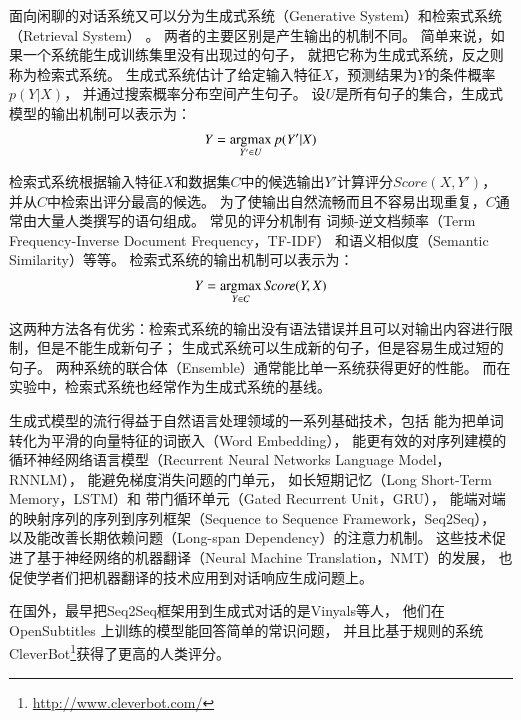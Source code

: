 面向闲聊的对话系统又可以分为生成式系统（Generative System）和检索式系统（Retrieval System）
。
两者的主要区别是产生输出的机制不同。
简单来说，如果一个系统能生成训练集里没有出现过的句子，
就把它称为生成式系统，反之则称为检索式系统。
生成式系统估计了给定输入特征$X$，预测结果为$Y$的条件概率$p(Y|X)$，
并通过搜索概率分布空间产生句子。
设$U$是所有句子的集合，生成式模型的输出机制可以表示为：
\begin{align}
    Y = \operatorname*{argmax}_{Y'\in U} p(Y'|X)
\end{align}

检索式系统根据输入特征$X$和数据集$C$中的候选输出$Y'$计算评分$\textit{Score}(X, Y')$，
并从$C$中检索出评分最高的候选。
为了使输出自然流畅而且不容易出现重复，$C$通常由大量人类撰写的语句组成。
常见的评分机制有
词频-逆文档频率（Term Frequency-Inverse Document Frequency，TF-IDF）
和语义相似度（Semantic Similarity）等等。
检索式系统的输出机制可以表示为：
\begin{align}
    Y = \operatorname*{argmax}_{Y\in C} \textit{Score}(Y, X)
\end{align}

这两种方法各有优劣：检索式系统的输出没有语法错误并且可以对输出内容进行限制，但是不能生成新句子；
生成式系统可以生成新的句子，但是容易生成过短的句子。
两种系统的联合体（Ensemble）通常能比单一系统获得更好的性能。
而在实验中，检索式系统也经常作为生成式系统的基线。

生成式模型的流行得益于自然语言处理领域的一系列基础技术，包括
能为把单词转化为平滑的向量特征的词嵌入（Word Embedding），
能更有效的对序列建模的循环神经网络语言模型（Recurrent Neural Networks Language Model，RNNLM），
能避免梯度消失问题的门单元，
如长短期记忆（Long Short-Term Memory，LSTM）和
带门循环单元（Gated Recurrent Unit，GRU），
能端对端的映射序列的序列到序列框架（Sequence to Sequence Framework，Seq2Seq），
以及能改善长期依赖问题（Long-span Dependency）的注意力机制。
这些技术促进了基于神经网络的机器翻译（Neural Machine Translation，NMT）的发展，
也促使学者们把机器翻译的技术应用到对话响应生成问题上。

在国外，最早把Seq2Seq框架用到生成式对话的是Vinyals等人，
他们在OpenSubtitles
上训练的模型能回答简单的常识问题，
并且比基于规则的系统CleverBot\footnote{\url{http://www.cleverbot.com/}}获得了更高的人类评分。

